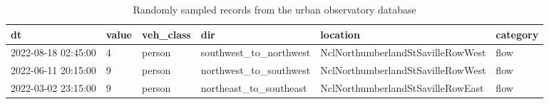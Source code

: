 \begin{table}[ht]
    \centering
    \scriptsize
    \begin{tabular}{p{2cm}p{1cm}p{1.5cm}p{3cm}p{5cm}p{1cm}}
        \toprule
        \textbf{dt}         & \textbf{value} & \textbf{veh\_class} & \textbf{dir}             & \textbf{location}                 & \textbf{category} \\
        \midrule
        2022-08-18 02:45:00 & 4              & person              & southwest\_to\_northwest & NclNorthumberlandStSavilleRowWest & flow              \\
        2022-06-11 20:15:00 & 9              & person              & northwest\_to\_southwest & NclNorthumberlandStSavilleRowWest & flow              \\
        2022-03-02 23:15:00 & 9              & person              & northeast\_to\_southeast & NclNorthumberlandStSavilleRowEast & flow              \\
        \bottomrule
    \end{tabular}
    \caption{Randomly sampled records from the urban observatory database}
    \label{tab:flowdata}
\end{table}